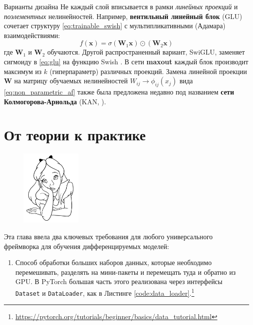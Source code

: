 \begin{supportbox}{Варианты дизайна}
Не каждый слой вписывается в рамки \textit{линейных проекций} и \textit{поэлементных} нелинейностей. Например, \textbf{вентильный линейный блок} (GLU) \cite{dauphin2017language} сочетает структуру \eqref{eq:trainable_swish} с мультипликативными (Адамара) взаимодействиями:
%
\begin{equation}
f(\mathbf{x}) = \sigma\left(\mathbf{W}_1\mathbf{x}\right)\odot\left(\mathbf{W}_2\mathbf{x}\right)
\label{eq:glu}
\end{equation}
%
где $\mathbf{W}_1$ и $\mathbf{W}_2$ обучаются. Другой распространенный вариант, SwiGLU, заменяет сигмоиду в \eqref{eq:glu} на функцию Swish \cite{shazeer2020glu}. В сети \textbf{maxout} \cite{goodfellow2013maxout} каждый блок производит максимум из $k$ (гиперпараметр) различных проекций. Замена линейной проекции $\mathbf{W}$ на матрицу обучаемых нелинейностей $W_{ij} \rightarrow \phi_{ij}(x_j)$ вида \eqref{eq:non_parametric_af} также была предложена недавно под названием \textbf{сети Колмогорова-Арнольда} (KAN, \cite{liu2024kan}).
%
\end{supportbox}

\section*{От теории к практике}

\begin{figure}
\vspace{-3em}\includegraphics[width=3.0cm]{images/shutterstock_2075221579.jpg}
\vspace{-5em}
\end{figure}

Эта глава ввела два ключевых требования для любого универсального фреймворка для обучения дифференцируемых моделей:

\begin{enumerate}
\item Способ обработки больших наборов данных, которые необходимо перемешивать, разделять на мини-пакеты и перемещать туда и обратно из GPU. В PyTorch большая часть этого реализована через интерфейсы {\texttt{Dataset}} и \texttt{DataLoader}, как в Листинге \ref{code:data_loader}.\footnote{\url{https://pytorch.org/tutorials/beginner/basics/data_tutorial.html}}
\end{enumerate}

